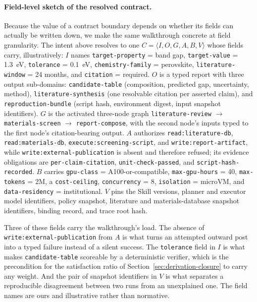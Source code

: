 \paragraph{Field-level sketch of the resolved contract.}
Because the value of a contract boundary depends on whether its fields can actually be written down, we make the same walkthrough concrete at field granularity. The intent above resolves to one $C=\langle I,O,G,A,B,V\rangle$ whose fields carry, illustratively: $I$ names \texttt{target-property} = band gap, \texttt{target-value} = 1.3~eV, \texttt{tolerance} = 0.1~eV, \texttt{chemistry-family} = perovskite, \texttt{literature-window} = 24 months, and \texttt{citation} = required. $O$ is a typed report with three output sub-domains: \texttt{candidate-table} (composition, predicted gap, uncertainty, method), \texttt{literature-synthesis} (one resolvable citation per asserted claim), and \texttt{reproduction-bundle} (script hash, environment digest, input snapshot identifiers). $G$ is the activated three-node graph \texttt{literature-review} $\rightarrow$ \texttt{materials-screen} $\rightarrow$ \texttt{report-compose}, with the second node's inputs typed to the first node's citation-bearing output. $A$ authorizes \texttt{read:literature-db}, \texttt{read:materials-db}, \texttt{execute:screening-script}, and \texttt{write:report-artifact}, while \texttt{write:external-publication} is absent and therefore refused; its evidence obligations are \texttt{per-claim-citation}, \texttt{unit-check-passed}, and \texttt{script-hash-recorded}. $B$ carries \texttt{gpu-class} = A100-or-compatible, \texttt{max-gpu-hours} = 40, \texttt{max-tokens} = 2M, a \texttt{cost-ceiling}, \texttt{concurrency} = 8, \texttt{isolation} = microVM, and \texttt{data-residency} = institutional. $V$ pins the Skill versions, planner and executor model identifiers, policy snapshot, literature and materials-database snapshot identifiers, binding record, and trace root hash.

Three of these fields carry the walkthrough's load. The absence of \texttt{write:external-publication} from $A$ is what turns an attempted outward post into a typed failure instead of a silent success. The \texttt{tolerance} field in $I$ is what makes \texttt{candidate-table} scoreable by a deterministic verifier, which is the precondition for the satisfaction ratio of Section~\ref{sec:derivation-closure} to carry any weight. And the pair of snapshot identifiers in $V$ is what separates a reproducible disagreement between two runs from an unexplained one. The field names are ours and illustrative rather than normative.

